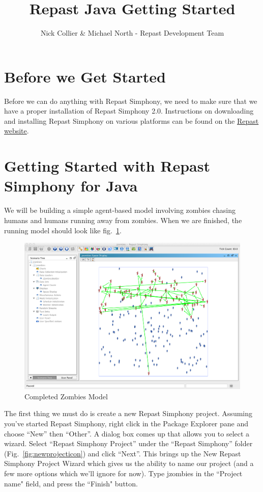 \documentclass[11pt]{amsart}
\title{Repast Java Getting Started}
\author{Nick Collier \& Michael North - Repast Development Team}
\begin{document}
 
\maketitle
\setcounter{section}{-1}

\section{Before we Get Started}
Before we can do anything with Repast Simphony, we need to make sure that we have a proper installation of Repast Simphony 2.0. Instructions on downloading and installing Repast Simphony on various platforms can be found on the \href{http://repast.sourceforge.net/download.html}{Repast website}.

\section{Getting Started with Repast Simphony for Java}
We will be building a simple agent-based model involving  zombies chasing humans and humans running away from zombies. When we are finished, the running model should look like fig.~\ref{fig:final}.

\begin{figure}[h]
\begin{center}
\vspace{.2in}
\centerline {
\includegraphics[width=5in]{GettingStartedImages/final.png}
}
\caption{Completed Zombies Model}
\label{fig:final}
\end{center}
\end{figure}

The first thing we must do is create a new Repast Simphony project. Assuming you've started Repast Simphony, right click in the Package Explorer pane and choose ``New'' then ``Other''. A dialog box comes up that allows you to select a wizard. Select ``Repast Simphony Project'' under the ``Repast Simphony'' folder (Fig.~\ref{fig:newprojecticon}) and click ``Next''. This brings up the New Repast Simphony Project Wizard  which gives us the ability to name our project (and a few more options which we'll ignore for now). Type jzombies in the ``Project name" field, and press the ``Finish" button.
\end{document}
